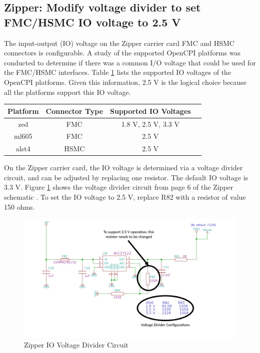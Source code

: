 \documentclass{article}
\begin{document}
\subsection*{Zipper: Modify voltage divider to set FMC/HSMC IO voltage to 2.5 V}
The input-output (IO) voltage on the Zipper carrier card FMC and HSMC connectors is configurable. A study of the supported OpenCPI platforms was conducted to determine if there was a common I/O voltage that could be used for the FMC/HSMC interfaces. Table \ref{table:io_voltages} lists the supported IO voltages of the OpenCPI platforms. Given this information, 2.5 V is the logical choice because all the platforms support this IO voltage.\par\smallskip
		\begin{table}[h]
			\begin{center}
				\scriptsize
  				\begin{tabular}{|c|c|c|c|}
    			\hline
    			\rowcolor{blue}
    			Platform & Connector Type & Supported IO Voltages\\
    			\hline
    			zed & FMC & 1.8 V, 2.5 V, 3.3 V\\
    			\hline
    			ml605 & FMC & 2.5 V\\
    			\hline
    			alst4 & HSMC & 2.5 V\\
    			\hline
   				\end{tabular}
				\label{table:io_voltages}
		  	\end{center}
   		\end{table}
\normalsize
\noindent On the Zipper carrier card, the IO voltage is determined via a voltage divider circuit, and can be adjusted by replacing one resistor. The default IO voltage is 3.3 V. Figure \ref{fig:zipper_voltage_divider} shows the voltage divider circuit from page 6 of the Zipper schematic \cite{zipper_sch}. To set the IO voltage to 2.5 V, replace R82 with a resistor of value 150 ohms.\par\smallskip
	\begin{figure}[ht]
		\begin{center}
		\includegraphics[scale=0.4]{zipper_voltage_divider}
		\caption{Zipper IO Voltage Divider Circuit}
		\label{fig:zipper_voltage_divider}
		\end{center}
	\end{figure}
\end{document}
